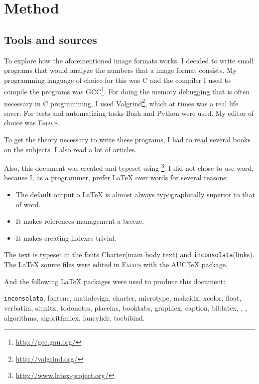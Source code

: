 \begin{comment}
  
\end{comment}

\chapter{Method}
\label{cha:method}

\section{Tools and sources}

To explore how the aforementioned image formats works, I decided to
write small programs that would analyze the numbers that a image
format consists. My programming language of choice for this was C and
the compiler I used to compile the programs was
GCC\footnote{\url{http://gcc.gnu.org/}}. For doing the memory debugging that
is often necessary in C programming, I used
Valgrind\footnote{\url{http://valgrind.org/}}, which at times was a
real life saver. For tests and automatizing tasks Bash and Python were
used. My editor of choice was \textsc{Emacs}.

To get the theory necessary to write these programs, I had to read
several books on the subjects. I also read a lot of articles.

Also, this document was created and typeset using
\LaTeXe{}\footnote{\url{http://www.latex-project.org/}}. I did not
chose to use word, because I, as a programmer, prefer \LaTeX{} over
words for several reasons:

\begin{itemize}
\item The default output o \LaTeX{} is almost always typographically
  superior to that of word.
\item It makes references management a breeze.
\item It makes creating indexes trivial.
\end{itemize}

The text is typeset in the fonts Charter(main body text) and
\texttt{inconsolata}(links). The \LaTeX{} source files were edited in
\textsc{Emacs} with the AUC\TeX{} package.

And the following \LaTeX{} packages were used to produce this document:

\texttt{inconsolata}, fontenc, mathdesign, charter, microtype,
makeidx, xcolor, float, verbatim, siunitx, todonotes, placeins,
booktabs, graphicx, caption, biblatex, \tikzname, \pgf , algorithms,
algorithmicx, fancyhdr, tocbibind.

